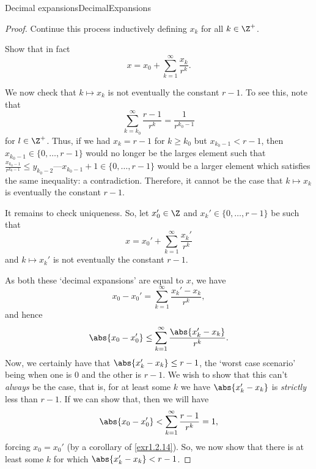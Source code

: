 \begin{thm}{Decimal expansions}{DecimalExpansions}
\begin{proof}
Continue this process inductively defining $x_k$ for all $k\in \Z ^+$.
\begin{exr}[breakable=false]{}{}
Show that in fact
\begin{equation}
x=x_0+\sum _{k=1}^{\infty}\frac{x_k}{r^k}.
\end{equation}
\end{exr}

We now check that $k\mapsto x_k$ is not eventually the constant $r-1$.  To see this, note that
\begin{equation}
\sum _{k=k_0}^{\infty}\frac{r-1}{r^k}=\frac{1}{r^{k_0-1}}
\end{equation}
for $l\in \Z ^+$.  Thus, if we had $x_k=r-1$ for $k\geq k_0$ but $x_{k_0-1}<r-1$, then $x_{k_0-1}\in \{ 0,\ldots ,r-1\}$ would no longer be the larges element such that $\frac{x_{k_0-1}}{r^{k_0-1}}\leq y_{k_0-2}$---$x_{k_0-1}+1\in \{ 0,\ldots ,r-1\}$ would be a larger element which satisfies the same inequality:  a contradiction.  Therefore, it cannot be the case that $k\mapsto x_k$ is eventually the constant $r-1$.

It remains to check uniqueness.  So, let $x_0'\in \Z$ and $x_k'\in \{ 0,\ldots ,r-1\}$ be such that
\begin{equation}
x=x_0'+\sum _{k=1}^{\infty}\frac{x_k'}{r^k}
\end{equation}
and $k\mapsto x_k'$ is not eventually the constant $r-1$.

As both these `decimal expansions' are equal to $x$, we have
\begin{equation}
x_0-x_0'=\sum _{k=1}^{\infty}\frac{x_k'-x_k}{r^k},
\end{equation}
and hence
\begin{equation}
\abs{x_0-x_0'}\leq \sum _{k=1}^{\infty}\frac{\abs{x_k'-x_k}}{r^k}.
\end{equation}
Now, we certainly have that $\abs{x_k'-x_k}\leq r-1$, the `worst case scenario' being when one is $0$ and the other is $r-1$.  We wish to show that this can't \emph{always} be the case, that is, for at least some $k$ we have $\abs{x_k'-x_k}$ is \emph{strictly} less than $r-1$.  If we can show that, then we will have
\begin{equation}\label{eqn2.4.129}
\abs{x_0-x_0'}<\sum _{k=1}^{\infty}\frac{r-1}{r^k}=1,
\end{equation}
forcing $x_0=x_0'$ (by a corollary of \cref{exr1.2.14}).  So, we now show that there is at least some $k$ for which $\abs{x_k'-x_k}<r-1$.


\end{proof}
\end{thm}

